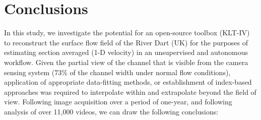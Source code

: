 \documentclass[hess, manuscript]{copernicus}
\begin{document}
\section{Conclusions}
In this study, we investigate the potential for an open-source toolbox (KLT-IV) to reconstruct the surface flow field of the River Dart (UK) for the purposes of estimating section averaged (1-D velocity) in an unsupervised and autonomous workflow. Given the partial view of the channel that is visible from the camera sensing system (73\% of the channel width under normal flow conditions), application of appropriate data-fitting methods, or establishment of index-based approaches was required to interpolate within and extrapolate beyond the field of view. Following image acquisition over a period of one-year, and following analysis of over 11,000 videos, we can draw the following conclusions:
\end{document}
